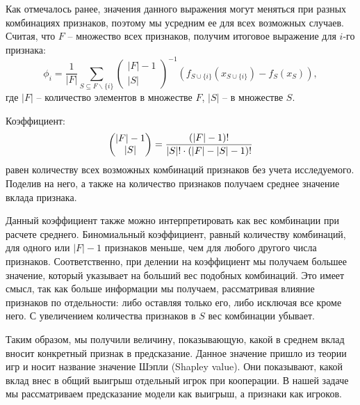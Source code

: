 Как отмечалось ранее, значения данного выражения могут меняться при разных комбинациях признаков, поэтому мы усредним ее для всех возможных случаев. Считая, что $F$ -- множество всех признаков, получим итоговое выражение для $i$-го признака:
\[
\phi_i = \frac{1}{|F|} \sum\limits_{S \subseteq F \backslash \{i\}}
\begin{pmatrix}
|F| - 1 \\
|S|
\end{pmatrix}^{-1}
(f_{S \cup \{i\}}(x_{S \cup \{i\}}) - f_S(x_S)),
\]
где $|F|$ -- количество элементов в множестве $F$, $|S|$ -- в множестве $S$.

Коэффициент:
\[
\displaystyle \begin{pmatrix}
|F| - 1 \\
|S|
\end{pmatrix} = \frac{(|F|-1)!}{|S|! \cdot (|F| - |S| - 1)!}
\]
равен количеству всех возможных комбинаций признаков без учета исследуемого. Поделив на него, а также на количество признаков получаем среднее значение вклада признака. %

Данный коэффициент также можно интерпретировать как вес комбинации при расчете среднего. Биномиальный коэффициент, равный количеству комбинаций, для одного или $|F|-1$ признаков меньше, чем для любого другого числа признаков. Соответственно, при делении на коэффициент мы получаем большее значение, который указывает на больший вес подобных комбинаций. Это имеет смысл, так как больше информации мы получаем, рассматривая влияние признаков по отдельности: либо оставляя только его, либо исключая все кроме него. С увеличением количества признаков в $S$ вес комбинации убывает.

Таким образом, мы получили величину, показывающую, какой в среднем вклад вносит конкретный признак в предсказание. Данное значение пришло из теории игр и носит название значение Шэпли (Shapley value). Они показывают, какой вклад внес в общий выигрыш отдельный игрок при кооперации. В нашей задаче мы рассматриваем предсказание модели как выигрыш, а признаки как игроков.